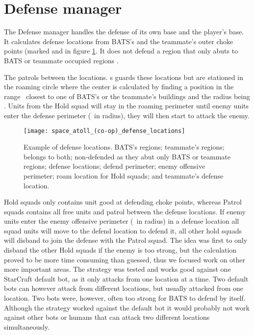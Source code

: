 \section{Defense manager}
\label{sec:defense_manager}
The Defense manager handles the defense of its own base and the player’s base. It calculates defense
locations from BATS's and the teammate's outer choke points (marked \usebox{\LegendDotRed} and
\usebox{\LegendDotOrange} in figure \ref{fig:defense_locations}. It does not defend a region that
only abuts to BATS or teammate occupied regions \usebox{\LegendLineYellow}.

The  patrols between the \usebox{\LegendDotRed} locations.
s guards these locations but are stationed in the roaming circle
\usebox{\LegendCircleViolet} where the center is calculated by finding a position in the range
\squadDefendRoamDistanceMinMax~closest to one of BATS’s or the teammate’s buildings and the radius
being \squadDefendRoamPerimeter. Units from the Hold squad will stay in the roaming perimeter until
enemy units enter the defense perimeter (\squadDefendDefendPerimeter~in radius), they will then
start to attack the enemy.

\begin{figure}[htb]
\centering
\texttt{[image: space\_atoll\_(co-op)\_defense\_locations]}
\caption[Defense locations example]{
	Example of defense locations.
	\usebox{\LegendLineLightGreen} BATS’s regions;
	\usebox{\LegendLineLightBlue} teammate’s regions;
	\usebox{\LegendLineLightGreenLightBlue} belongs to both;
	\usebox{\LegendLineYellow} non-defended as they abut only BATS or teammate regions;
	\usebox{\LegendDotRed} defense locations;
	\usebox{\LegendCircleRed} defend perimeter;
	\usebox{\LegendCircleBrown} enemy offensive perimeter;
	\usebox{\LegendCircleViolet} roam location for Hold squads; and
	\usebox{\LegendDotOrange} teammate's defense location.}
\label{fig:defense_locations}
\end{figure}

Hold squads only contains unit good at defending choke points, whereas Patrol squads contains all
free units and patrol between the defense locations. If enemy units enter the enemy offensive
perimeter (\squadDefendEnemyOffensivePerimeter~in radius) in a defense location all squad units will
move to the defend location to defend it, all other hold squads will disband to join the defense
with the Patrol squad. The idea was first to only disband the other Hold squads if the enemy is too
strong, but the calculation proved to be more time consuming than guessed, thus we focused work on
other more important areas. The strategy was tested and works good against one StarCraft default
bot, as it only attacks from one location at a time.  Two default bots can however attack from
different locations, but usually attacked from one location. Two bots were, however, often too
strong for BATS to defend by itself. Although the strategy worked against the default bot it would
probably not work against other bots or humans that can attack two different locations
simultaneously.

